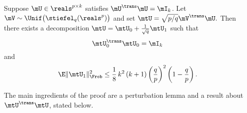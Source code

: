 \begin{proposition}\label{P:project-kframe}
    Suppose $\mU \in \reals^{p \times k}$ satisfies $\mU^\trans \mU = \mI_k$.
    Let $\mV \sim \Unif\big( \stiefel_q(\reals^p) \big)$ and set
    \(
        \mtU = \sqrt{p/q} \mV^\trans \mU.
    \)
    Then there exists a decomposition 
    $\mtU = \mtU_0 + \frac{1}{\sqrt{q}} \mtU_1$ such that
    \[
        \mtU_0^\trans \mtU_0 = \mI_k
    \]
    and
    \[
        \E \| \mtU_1 \|_\Frob^2 
            \leq
                \frac{1}{8} \,
                k^2 \, (k + 1)
                \left( \frac{q}{p} \right)^2
                \left( 1 - \frac{q}{p} \right).
    \]
\end{proposition}

\noindent
The main ingredients of the proof are a perturbation lemma and a result about $\mtU^\trans \mtU$, stated below.

